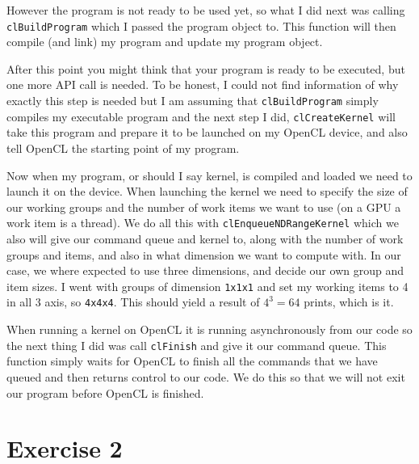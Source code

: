 \documentclass[a4paper, 12pt]{article}
\def\code#1{\texttt{#1}}
\begin{document}
However the program is not ready to be used yet, so what I did next was calling \code{clBuildProgram} which I passed the program object to. This function will then compile (and link) my program and update my program object.

After this point you might think that your program is ready to be executed, but one more API call is needed. To be honest, I could not find information of why exactly this step is needed but I am assuming that \code{clBuildProgram} simply compiles my executable program and the next step I did, \code{clCreateKernel} will take this program and prepare it to be launched on my OpenCL device, and also tell OpenCL the starting point of my program.

Now when my program, or should I say kernel, is compiled and loaded we need to launch it on the device. When launching the kernel we need to specify the size of our working groups and the number of work items we want to use (on a GPU a work item is a thread). We do all this with \code{clEnqueueNDRangeKernel} which we also will give our command queue and kernel to, along with the number of work groups and items, and also in what dimension we want to compute with. In our case, we where expected to use three dimensions, and decide our own group and item sizes. I went with groups of dimension \code{1x1x1} and set my working items to 4 in all 3 axis, so \code{4x4x4}. This should yield a result of $4^3 = 64$ prints, which is it.

When running a kernel on OpenCL it is running asynchronously from our code so the next thing I did was call \code{clFinish} and give it our command queue. This function simply waits for OpenCL to finish all the commands that we have queued and then returns control to our code. We do this so that we will not exit our program before OpenCL is finished.

\section{Exercise 2}
\end{document}
